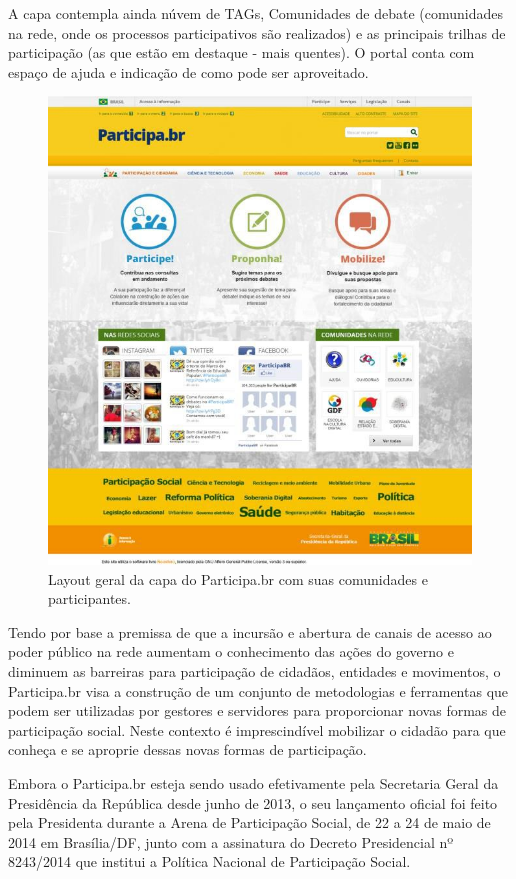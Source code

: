 \documentclass{article}
\begin{document}
A capa contempla ainda núvem de TAGs, Comunidades de debate (comunidades na
rede, onde os processos participativos são realizados) e as principais trilhas
de participação (as que estão em destaque - mais quentes). O portal conta com
espaço de ajuda e indicação de como pode ser aproveitado.

\begin{figure}[h]
  \center
  \includegraphics[scale=0.4]{imagens/screenshot-participa.png}
  \caption{Layout geral da capa do Participa.br com suas comunidades e participantes.}
  \label{screenshot-participa}
\end{figure}

Tendo por base a premissa de que a incursão e abertura de canais de acesso ao
poder público na rede aumentam o conhecimento das ações do governo e diminuem
as barreiras para participação de cidadãos, entidades e movimentos, o
Participa.br visa a construção de um conjunto de metodologias e ferramentas que
podem ser utilizadas por gestores e servidores para proporcionar novas formas
de participação social. Neste contexto é imprescindível mobilizar o cidadão
para que conheça e se aproprie dessas novas formas de participação.

Embora o Participa.br esteja sendo usado efetivamente pela Secretaria Geral
da Presidência da República desde junho de 2013, o seu lançamento oficial foi
feito pela Presidenta durante a Arena de Participação Social, de 22 a 24 de
maio de 2014 em Brasília/DF, junto com a assinatura do Decreto Presidencial nº
8243/2014 que institui a Política Nacional de Participação Social.
\end{document}

